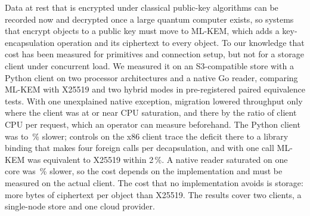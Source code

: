 Data at rest that is encrypted under classical public-key algorithms can be recorded now and
decrypted once a large quantum computer exists, so systems that encrypt objects to a public key
must move to ML-KEM, which adds a key-encapsulation operation and its ciphertext to every
object. To our knowledge that cost has been measured for primitives and connection setup, but not for
a storage client under concurrent load. We measured it on an S3-compatible store with a Python
client on two processor architectures and a native Go reader, comparing ML-KEM with X25519
and two hybrid modes in pre-registered paired equivalence tests. With one unexplained native exception, migration
lowered throughput only where the client was at or near CPU saturation, and there by the ratio
of client CPU per request, which an operator can measure beforehand. The Python
client was \RevHotDeficit{} to \ArmHotDeficit\,\% slower; controls on the x86 client trace the deficit there
to a library binding that makes four foreign calls per decapsulation, and with one call ML-KEM
was equivalent to X25519 within 2\,\%. A native reader saturated on one core was
\AudNOneMlkemDeficit\,\% slower, so the cost depends on the implementation and must be measured
on the actual client. The
cost that no implementation avoids is storage: \RevMetaIntrinsic{} more bytes of ciphertext per
object than X25519. The results cover two clients, a single-node store and one cloud
provider.
